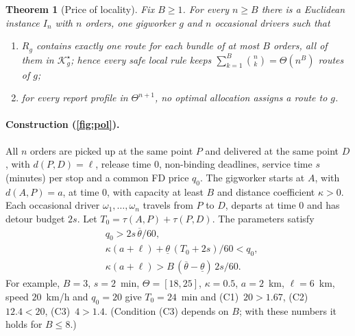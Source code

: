 \documentclass[11pt]{article}
\newtheorem{theorem}{Theorem}
\theoremstyle{definition}
\theoremstyle{remark}
\newcommand{\Ks}{\mathcal{K}^{\star}}
\newcommand{\thl}{\underline{\theta}}
\newcommand{\thu}{\overline{\theta}}
\begin{document}
\begin{theorem}[Price of locality]\label{thm:pol}
Fix $B\ge1$. For every $n\ge B$ there is a Euclidean instance $I_n$ with $n$
orders, one gigworker $g$ and $n$ occasional drivers such that
\begin{enumerate}[label=(\roman*), itemsep=1pt]
\item $R_g$ contains exactly one route for each bundle of at most $B$ orders,
all of them in $\Ks_g$; hence every safe local rule keeps
$\sum_{k=1}^{B}\binom nk=\Theta(n^B)$ routes of $g$;
\item for every report profile in $\Theta^{n+1}$, no optimal allocation assigns
a route to $g$.
\end{enumerate}
\end{theorem}

\paragraph{Construction (\cref{fig:pol}).} All $n$ orders are picked up at the
same point $P$ and delivered at the same point $D$, with $d(P,D)=\ell$, release
time $0$, non-binding deadlines, service time $s$ (minutes) per stop and a
common FD price $q_0$. The gigworker starts at $A$, with $d(A,P)=a$, at time
$0$, with capacity at least $B$ and distance coefficient $\kappa>0$. Each
occasional driver $\omega_1,\dots,\omega_n$ travels from $P$ to $D$, departs at
time $0$ and has detour budget $2s$. Let $T_0=\tau(A,P)+\tau(P,D)$. The
parameters satisfy
\begin{align}
&q_0>2s\,\thu/60, \tag{C1}\label{eq:C1}\\
&\kappa(a+\ell)+\thl\,(T_0+2s)/60<q_0, \tag{C2}\label{eq:C2}\\
&\kappa(a+\ell)>B\,(\thu-\thl)\,2s/60. \tag{C3}\label{eq:C3}
\end{align}
For example, $B=3$, $s=2$~min, $\Theta=[18,25]$, $\kappa=0.5$, $a=2$~km,
$\ell=6$~km, speed $20$~km/h and $q_0=20$ give $T_0=24$~min and
(C1)~$20>1.67$, (C2)~$12.4<20$, (C3)~$4>1.4$. (Condition (C3) depends on $B$;
with these numbers it holds for $B\le8$.)
\end{document}
